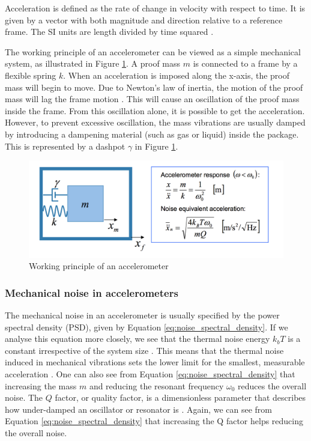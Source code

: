 Acceleration is defined as the rate of change in velocity with respect to time. It is given by a vector with both magnitude and direction relative to a reference frame. The SI units are length divided by time squared \cite{elert98}.

The working principle of an accelerometer can be viewed as a simple mechanical system, as illustrated in Figure \ref{fig:accel_working_principle}. A proof mass $m$ is connected to a frame by a flexible spring $k$. When an acceleration is imposed along the x-axis, the proof mass will begin to move. Due to Newton's law of inertia, the motion of the proof mass will lag the frame motion \cite[~p.34]{kaajakari09}. This will cause an oscillation of the proof mass inside the frame. From this oscillation alone, it is possible to get the acceleration. However, to prevent excessive oscillation, the mass vibrations are usually damped by introducing a dampening material (such as gas or liquid) inside the package. This is represented by a dashpot $\gamma$ in Figure \ref{fig:accel_working_principle}.

\begin{figure}[h]
\centering
\includegraphics[scale=0.5]{fig/accelerometer_working_principle.png}
\caption{Working principle of an accelerometer \cite[~p.34]{kaajakari09}}
\label{fig:accel_working_principle}
\end{figure}

\subsubsection{Mechanical noise in accelerometers}
\label{sec:mechanical_noise}
The mechanical noise in an accelerometer is usually specified by the power spectral density (PSD), given by Equation \ref{eq:noise_spectral_density}. If we analyse this equation more closely, we see that the thermal noise energy $k_b T$ is a constant irrespective of the system size \cite[~p.13]{kaajakari09}. This means that the thermal noise induced in mechanical vibrations sets the lower limit for the smallest, measurable acceleration \cite[~p.41]{kaajakari09}. One can also see from Equation \ref{eq:noise_spectral_density} that increasing the mass $m$ and reducing the resonant frequency $\omega_0$ reduces the overall noise. The $Q$ factor, or quality factor, is a dimensionless parameter that describes how under-damped an oscillator or resonator is \cite[~p.216]{harlow04}. Again, we can see from Equation \ref{eq:noise_spectral_density} that increasing the Q factor helps reducing the overall noise.

